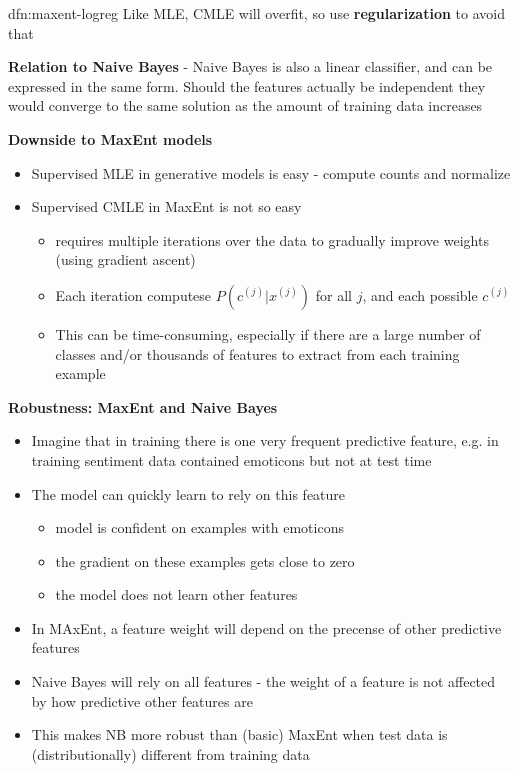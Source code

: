 \documentclass[landscape, 8pt]{extarticle}
\begin{document}
\begin{multicols}{3}
\begin{dfn}{dfn:maxent-logreg}{}
    Like MLE, CMLE will overfit, so use \textbf{regularization} to avoid that

\end{dfn}


\textbf{Relation to Naive Bayes} - Naive Bayes is also a linear classifier, and can be expressed in the same form. Should the features actually be independent they would converge to the same solution as the amount of training data increases

\textbf{Downside to MaxEnt models}
\begin{itemize}
    \setlength\itemsep{0em}
    \item Supervised MLE in generative models is easy - compute counts and normalize
    \item Supervised CMLE in MaxEnt is not so easy
        \begin{itemize}
            \setlength\itemsep{0em}
            \item requires multiple iterations over the data to gradually improve weights (using gradient ascent)
            \item Each iteration computese $P(c^{(j)} | x^{(j)})$ for all $j$, and each possible $c^{(j)}$
            \item This can be time-consuming, especially if there are a large number of classes and/or thousands of features to extract from each training example
        \end{itemize}
\end{itemize}

\textbf{Robustness: MaxEnt and Naive Bayes}
\begin{itemize}
    \setlength\itemsep{0em}
    \item Imagine that in training there is one very frequent predictive feature, e.g. in training sentiment data contained emoticons but not at test time
    \item The model can quickly learn to rely on this feature
        \begin{itemize}
            \setlength\itemsep{0em}
            \item model is confident on examples with emoticons
            \item the gradient on these examples gets close to zero
            \item the model does not learn other features
        \end{itemize}
    \item In MAxEnt, a feature weight will depend on the precense of other predictive features
    \item Naive Bayes will rely on all features - the weight of a feature is not affected by how predictive other features are
    \item This makes NB more robust than (basic) MaxEnt when test data is (distributionally) different from training data
\end{itemize}

\lipsum[1-12]
\end{multicols}
\end{document}
